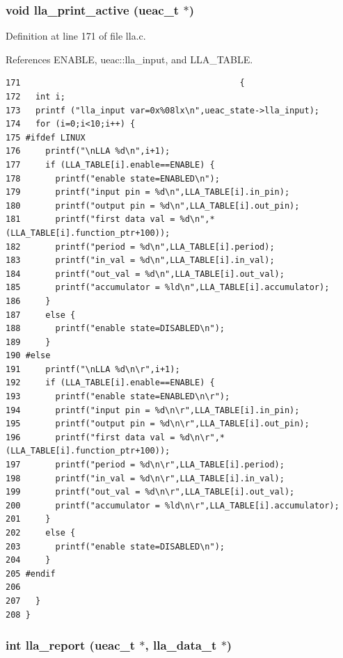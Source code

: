 \subsubsection{\setlength{\rightskip}{0pt plus 5cm}void lla\_\-print\_\-active ({\bf ueac\_\-t} $\ast$)}\label{lla_8h_a8}




Definition at line 171 of file lla.c.

References ENABLE, ueac::lla\_\-input, and LLA\_\-TABLE.

\footnotesize\begin{verbatim}171                                            {
172   int i;
173   printf ("lla_input var=0x%08lx\n",ueac_state->lla_input);
174   for (i=0;i<10;i++) {
175 #ifdef LINUX
176     printf("\nLLA %d\n",i+1);
177     if (LLA_TABLE[i].enable==ENABLE) {
178       printf("enable state=ENABLED\n");
179       printf("input pin = %d\n",LLA_TABLE[i].in_pin);
180       printf("output pin = %d\n",LLA_TABLE[i].out_pin);
181       printf("first data val = %d\n",*(LLA_TABLE[i].function_ptr+100));
182       printf("period = %d\n",LLA_TABLE[i].period);
183       printf("in_val = %d\n",LLA_TABLE[i].in_val);
184       printf("out_val = %d\n",LLA_TABLE[i].out_val);
185       printf("accumulator = %ld\n",LLA_TABLE[i].accumulator);
186     }
187     else {
188       printf("enable state=DISABLED\n");
189     }
190 #else 
191     printf("\nLLA %d\n\r",i+1);
192     if (LLA_TABLE[i].enable==ENABLE) {
193       printf("enable state=ENABLED\n\r");
194       printf("input pin = %d\n\r",LLA_TABLE[i].in_pin);
195       printf("output pin = %d\n\r",LLA_TABLE[i].out_pin);
196       printf("first data val = %d\n\r",*(LLA_TABLE[i].function_ptr+100));
197       printf("period = %d\n\r",LLA_TABLE[i].period);
198       printf("in_val = %d\n\r",LLA_TABLE[i].in_val);
199       printf("out_val = %d\n\r",LLA_TABLE[i].out_val);
200       printf("accumulator = %ld\n\r",LLA_TABLE[i].accumulator);
201     }
202     else {
203       printf("enable state=DISABLED\n");
204     }
205 #endif
206 
207   }
208 }
\end{verbatim}\normalsize 


\subsubsection{\setlength{\rightskip}{0pt plus 5cm}int lla\_\-report ({\bf ueac\_\-t} $\ast$, {\bf lla\_\-data\_\-t} $\ast$)}\label{lla_8h_a3}




